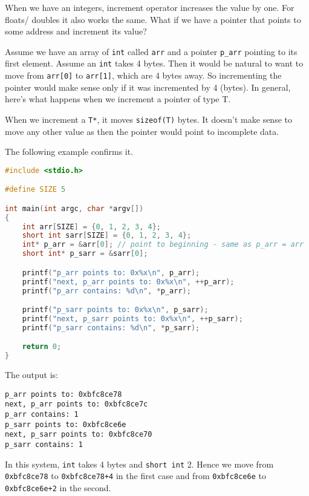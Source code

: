 \documentclass[a4paper]{article}
\begin{document}
When we have an integers, increment operator increases the value by one. For floats/ doubles it also works the same. What if we have a pointer that points to some address and increment its value? 

Assume we have an array of \texttt{int} called \texttt{arr} and a pointer \texttt{p\_arr} pointing to its first element. Assume  an \texttt{int} takes 4 bytes. Then it would be natural to want to move from \texttt{arr[0]} to \texttt{arr[1]}, which are 4 bytes away. So incrementing the pointer would make sense only if it was incremented by 4 (bytes). In general, here's what happens when we increment a pointer of type T. 
\begin{takeaway}
When we increment a \texttt{T*}, it moves \texttt{sizeof(T)} bytes. It doesn't make sense to move any other value as then the pointer would point to incomplete data.
\end{takeaway}
The following example confirms it.
\begin{exmp}
\begin{lstlisting}[language=c]
#include <stdio.h>

#define SIZE 5

int main(int argc, char *argv[])
{
	int arr[SIZE] = {0, 1, 2, 3, 4};
	short int sarr[SIZE] = {0, 1, 2, 3, 4};
	int* p_arr = &arr[0]; // point to beginning - same as p_arr = arr 
	short int* p_sarr = &sarr[0];

	printf("p_arr points to: 0x%x\n", p_arr);
	printf("next, p_arr points to: 0x%x\n", ++p_arr);
	printf("p_arr contains: %d\n", *p_arr);

	printf("p_sarr points to: 0x%x\n", p_sarr);
	printf("next, p_sarr points to: 0x%x\n", ++p_sarr);
	printf("p_sarr contains: %d\n", *p_sarr);

	return 0;
}
\end{lstlisting}
\end{exmp}
The output is:
\begin{verbatim}
p_arr points to: 0xbfc8ce78
next, p_arr points to: 0xbfc8ce7c
p_arr contains: 1
p_sarr points to: 0xbfc8ce6e
next, p_sarr points to: 0xbfc8ce70
p_sarr contains: 1
\end{verbatim}
In this system, \texttt{int} takes 4 bytes and \texttt{short int} 2. Hence we move from \texttt{0xbfc8ce78} to \texttt{0xbfc8ce78+4} in the first case and from \texttt{0xbfc8ce6e} to \texttt{0xbfc8ce6e+2} in the second.
\end{document}
